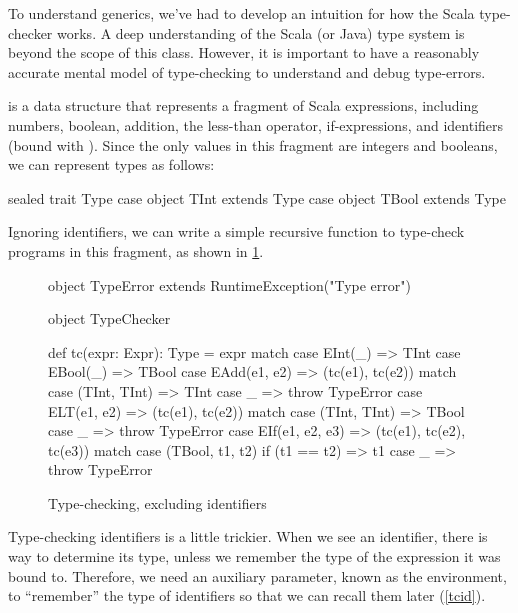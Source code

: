 \documentclass[9pt]{extbook}
\begin{document}
To understand generics, we've had to develop an intuition for how the Scala
type-checker works. A deep understanding of the Scala (or Java) type system is
beyond the scope of this class. However, it is important to have a reasonably
accurate mental model of type-checking to understand and debug type-errors.

 is a data structure that represents a fragment of
Scala expressions, including numbers, boolean, addition, the less-than operator,
if-expressions, and identifiers (bound with ). Since
the only values in this fragment are integers and booleans, we can represent
types as follows:

\begin{scalacode}
sealed trait Type
case object TInt extends Type
case object TBool extends Type
\end{scalacode}

Ignoring identifiers, we can write a simple recursive function to type-check
programs in this fragment, as shown in \cref{simpletc}.

\begin{figure}
\begin{scalacode}
object TypeError extends RuntimeException("Type error")

object TypeChecker {

  def tc(expr: Expr): Type = expr match {
    case EInt(_) => TInt
    case EBool(_) => TBool
    case EAdd(e1, e2) => (tc(e1), tc(e2)) match {
      case (TInt, TInt) => TInt
      case _ => throw TypeError
    }
    case ELT(e1, e2) => (tc(e1), tc(e2)) match {
      case (TInt, TInt) => TBool
      case _ => throw TypeError
    }
    case EIf(e1, e2, e3) => (tc(e1), tc(e2), tc(e3)) match {
      case (TBool, t1, t2) if (t1 == t2) => t1
      case _ => throw TypeError
    }
  }
}
\end{scalacode}
\caption{Type-checking, excluding identifiers}\label{simpletc}
\end{figure}

Type-checking identifiers is a little trickier. When we see an identifier,
there is way to determine its type, unless we remember the type
of the expression it was bound to. Therefore, we need an auxiliary
parameter, known as the environment, to ``remember'' the type of identifiers
so that we can recall them later (\cref{tcid}).
\end{document}
